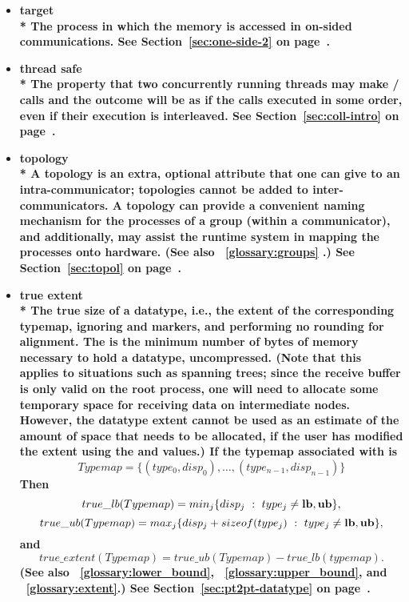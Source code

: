 \begin{itemize}
\label{glossary:target}
\item \bf{ target} \\*
The process in which the memory is accessed in on-sided communications.
See Section~\ref{sec:one-side-2} on page~\pageref{sec:one-side-2}.

\label{glossary:thread_safe}
\item \bf{ thread safe} \\*
The property that two concurrently
running threads may make \MPI/ calls and the outcome will be as if the
calls executed in some order, even if their execution is interleaved.
See Section~\ref{sec:coll-intro} on page~\pageref{sec:coll-intro}.

\label{glossary:topology}
\item \bf{ topology} \\* 
A topology is an extra,
optional attribute that one can give to an intra-communicator; topologies
cannot be added to inter-communicators.  A topology can provide a convenient
naming mechanism for the processes of a group (within a communicator), and
additionally, may assist the runtime system in mapping the processes onto
hardware.
(See also ~\ref{glossary:groups} .)
See Section~\ref{sec:topol} on page~\pageref{sec:topol}.

\label{glossary:true_extent}
\item \bf{ true extent} \\*
The true size of a datatype, i.e., the extent of the corresponding typemap, ignoring
 and  markers, and performing no
rounding for alignment.  The  is the minimum number of bytes of
memory necessary to hold a datatype, uncompressed. (Note that this applies
to situations such as spanning trees; since the receive buffer is only valid on the
root process, one will need to allocate some temporary space for
receiving data on intermediate nodes.  However, the datatype extent
cannot be used as an estimate of the amount of space that needs to be
allocated, if the user has modified the extent
using the  and  values.)
If the typemap associated with
 is
\[
Typemap = \{ (type_0, disp_0), \ldots , (type_{n-1}, disp_{n-1})\}
\]
Then
\[
true\_lb(Typemap) = min_j  \{ disp_j ~:~ type_j \ne {\bf lb, ub} \},
\]
\[
true\_ub (Typemap) = max_j \{disp_j + sizeof(type_j) ~:~ type_j \ne
{\bf lb, ub}\} ,
\]
and
\[
true\_extent (Typemap) = true\_ub(Typemap) - true\_lb(typemap).
\]
(See also ~\ref{glossary:lower_bound}, ~\ref{glossary:upper_bound}, and ~\ref{glossary:extent}.)
See Section~\ref{sec:pt2pt-datatype} on page~\pageref{sec:pt2pt-datatype}.


\end{itemize}
